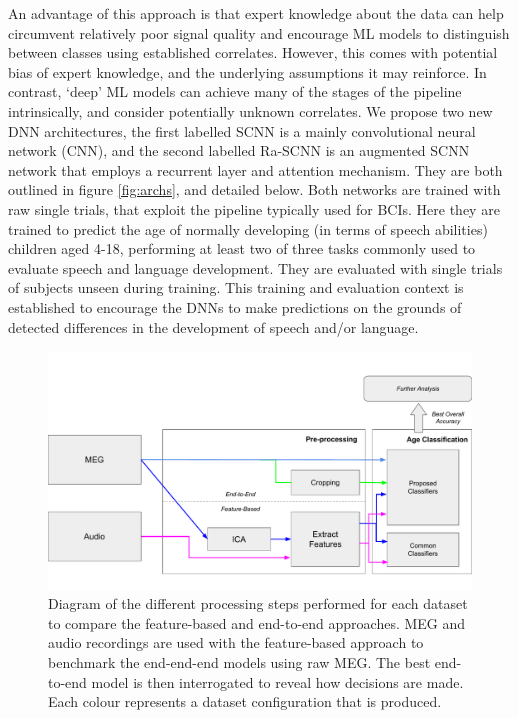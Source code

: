 \documentclass[fleqn,10pt]{wlscirep}
\begin{document}
An advantage of this approach is that expert knowledge about the data can help circumvent relatively poor signal quality and encourage ML models to distinguish between classes using established correlates. However, this comes with potential bias of expert knowledge, and the underlying assumptions it may reinforce. In contrast, `deep' ML models can achieve many of the stages of the pipeline intrinsically, and consider potentially unknown correlates. We propose two new DNN architectures, the first labelled SCNN is a mainly convolutional neural network (CNN), and the second labelled Ra-SCNN is an augmented SCNN network that employs a recurrent layer and attention mechanism. They are both outlined in figure \ref{fig:archs}, and detailed below. Both networks are trained with raw single trials, that exploit the pipeline typically used for BCIs. Here they are trained to predict the age of normally developing (in terms of speech abilities) children aged 4-18, performing at least two of three tasks commonly used to evaluate speech and language development. They are evaluated with single trials of subjects unseen during training. This training and evaluation context is established to encourage the DNNs to make predictions on the grounds of detected differences in the development of speech and/or language.

\begin{figure}[ht]
  \centering\includegraphics[width=0.7\linewidth]{pipeline.pdf}
   \caption{Diagram of the different processing steps performed for each dataset to compare the feature-based and end-to-end approaches. MEG and audio recordings are used with the feature-based approach to benchmark the end-end-end models using raw MEG. The best end-to-end model is then interrogated to reveal how decisions are made. Each colour represents a dataset configuration that is produced.}
 \label{fig:proc_stages}
\end{figure}
\end{document}
